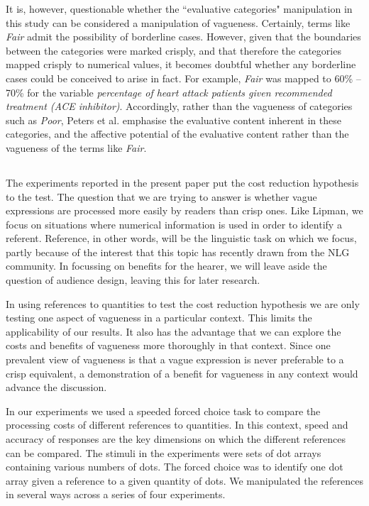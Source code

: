 \documentclass[
a4paper 
, doc
, longtable
]{apa6}
\begin{document}
It is, however, questionable whether the ``evaluative categories" manipulation in this study can be considered a manipulation of vagueness. Certainly, terms like \emph{Fair} admit the possibility of borderline cases. However, given that the boundaries between the categories were marked crisply, and that therefore the categories mapped crisply to numerical values, it becomes doubtful whether any borderline cases could be conceived to arise in fact. For example, \emph{Fair} was mapped to 60\% -- 70\% for the variable \emph{percentage of heart attack patients given recommended treatment (ACE inhibitor)}. Accordingly, rather than the vagueness of categories such as \emph{Poor}, Peters et al. emphasise the evaluative content inherent in these categories, and the affective potential of the evaluative content rather than the vagueness of the terms like {\em Fair}.
\subsection{}
The experiments reported in the present paper put the cost reduction hypothesis to the test. The question that we are trying to answer is whether vague expressions are processed more easily by readers than crisp ones. Like Lipman, we focus on situations where numerical information is used in order to identify a referent. Reference, in other words, will be the linguistic task on which we focus, partly because of the interest that this topic has recently drawn from the NLG community.  In focussing on benefits for the hearer, we will leave aside the question of audience design, leaving this for later research.

In using references to quantities to test the cost reduction hypothesis we are only testing one aspect of vagueness in a particular context. This limits the applicability of our results. It also has the advantage that we can explore the costs and benefits of vagueness more thoroughly in that context. Since one prevalent view of vagueness is that a vague expression is never preferable to a crisp equivalent, a demonstration of a benefit for vagueness in any context would advance the discussion.

In our experiments we used a speeded forced choice task to compare the processing costs of different references to quantities. In this context, speed and accuracy of responses are the key dimensions on which the different references can be compared. The stimuli in the experiments were sets of dot arrays containing various numbers of dots. The forced choice was to identify one dot array given a reference to a given quantity of dots. We manipulated the references in several ways across a series of four experiments. 
\end{document}
